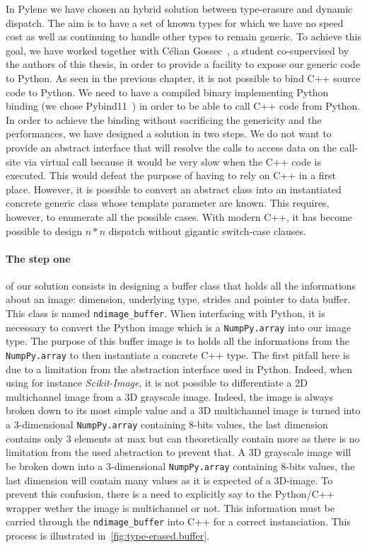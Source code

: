 In Pylene we have chosen an hybrid solution between type-erasure and dynamic dispatch. The aim is to have a set of known
types for which we have no speed cost as well as continuing to handle other types to remain generic. To achieve this
goal, we have worked together with Célian Gossec~\cite{gossec.2019.pybind}, a student co-supervised by the authors of
this thesis, in order to provide a facility to expose our generic code to Python. As seen in the previous chapter, it is
not possible to bind C++ source code to Python. We need to have a compiled binary implementing Python binding (we chose
Pybind11~\parencite{jakob.2017.pybind11}) in order to be able to call C++ code from Python. In order to achieve the
binding without sacrificing the genericity and the performances, we have designed a solution in two steps. We do not
want to provide an abstract interface that will resolve the calls to access data on the call-site via virtual call
because it would be very slow when the C++ code is executed. This would defeat the purpose of having to rely on C++ in a
first place. However, it is possible to convert an abstract class into an instantiated concrete generic class whose
template parameter are known. This requires, however, to enumerate all the possible cases. With modern C++, it has
become possible to design $n*n$ dispatch without gigantic switch-case clauses.

\paragraph{The step one} of our solution consists in designing a buffer class that holds all the informations about an
image: dimension, underlying type, strides and pointer to data buffer. This class is named \texttt{ndimage\_buffer}.
When interfacing with Python, it is necessary to convert the Python image which is a \texttt{NumpPy.array} into our
image type. The purpose of this buffer image is to holds all the informations from the \texttt{NumpPy.array} to then
instantiate a concrete C++ type. The first pitfall here is due to a limitation from the abstraction interface used in
Python. Indeed, when using for instance \emph{Scikit-Image}, it is not possible to differentiate a 2D multichannel image
from a 3D grayscale image. Indeed, the image is always broken down to its most simple value and a 3D multichannel image
is turned into a 3-dimensional \texttt{NumpPy.array} containing 8-bits values, the last dimension contains only 3
elements at max but can theoretically contain more as there is no limitation from the used abstraction to prevent that.
A 3D grayscale image will be broken down into a 3-dimensional \texttt{NumpPy.array} containing 8-bits values, the last
dimension will contain many values as it is expected of a 3D-image. To prevent this confusion, there is a need to
explicitly say to the Python/C++ wrapper wether the image is multichannel or not. This information must be carried
through the \texttt{ndimage\_buffer} into C++ for a correct instanciation. This process is illustrated
in~\cref{fig:type-erased.buffer}.

